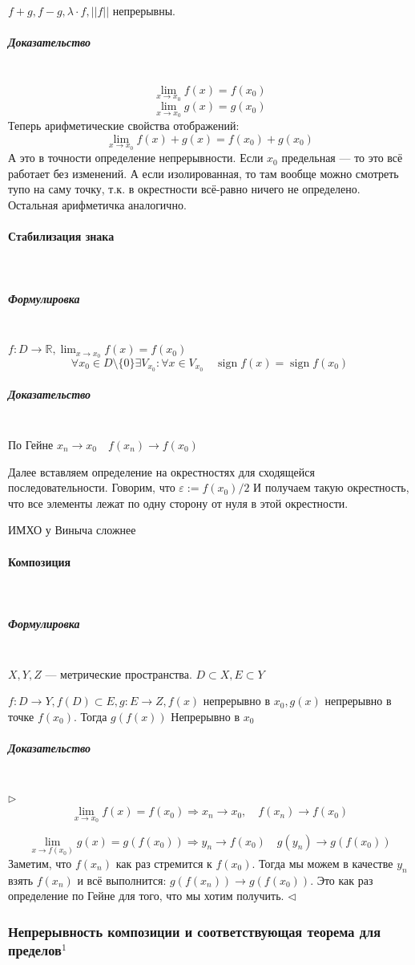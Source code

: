 \documentclass{article}
\DeclareMathOperator{\sign}{sign}
\let\vanillaparagraph\paragraph
\let\vanillasubparagraph\subparagraph
\renewcommand{\paragraph}[1]{\vanillaparagraph{#1}\mbox{}\\}
\renewcommand{\subparagraph}[1]{\vanillasubparagraph{#1}\mbox{}\\}
\begin{document}
$f + g, f - g, \lambda \cdot f, || f ||$ непрерывны.
\subparagraph{Доказательство}
$$
\lim_{x\rightarrow x_0} f(x) = f(x_0)
$$
$$
\lim_{x\rightarrow x_0} g(x) = g(x_0)
$$
Теперь арифметические свойства отображений:
$$
\lim_{x\rightarrow x_0} f(x) + g(x) = f(x_0) + g(x_0)
$$
А это в точности определение непрерывности. Если $x_0$ предельная --- то это всё работает без изменений. А если изолированная, то там вообще можно смотреть тупо на саму точку, т.к. в окрестности всё-равно ничего не определено. Остальная арифметичка аналогично.

\paragraph{Стабилизация знака}
\subparagraph{Формулировка}
$f: D \rightarrow \mathbb{R}, \lim_{x\rightarrow x_0} f(x) = f(x_0)$
$$
\forall x_0 \in D \setminus \{0\} \exists V_{x_0} : \forall x \in V_{x_0} \quad \sign f(x) = \sign f(x_0)
$$

\subparagraph{Доказательство}
По Гейне $x_n \rightarrow x_0 \quad f(x_n) \rightarrow f(x_0)$

Далее вставляем определение на окрестностях для сходящейся последовательности. Говорим, что $\varepsilon := f(x_0) / 2$ И получаем такую окрестность, что все элементы лежат по одну сторону от нуля в этой окрестности. 

ИМХО у Виныча сложнее

\paragraph{Композиция}
\label{Композиция}
\subparagraph{Формулировка}
$X, Y, Z$ --- метрические пространства. $D \subset X, E \subset Y$ 

$f: D \rightarrow Y, f(D) \subset E, g: E \rightarrow Z, f(x)$ непрерывно в $x_0, g(x)$ непрерывно в точке $f(x_0)$. Тогда $g(f(x))$ Непрерывно в $x_0$

\subparagraph{Доказательство}
$\rhd$
$$
\lim_{x\rightarrow x_0} f(x) = f(x_0) \Rightarrow x_n \rightarrow x_0, \quad f(x_n) \rightarrow f(x_0)
$$

$$
\lim_{x\rightarrow f(x_0)} g(x) = g(f(x_0)) \Rightarrow y_n \rightarrow f(x_0) \quad g(y_n) \rightarrow g(f(x_0))
$$
Заметим, что $f(x_n)$ как раз стремится к $f(x_0)$. Тогда мы можем в качестве $y_n$ взять $f(x_n)$ и всё выполнится: $g(f(x_n)) \rightarrow g(f(x_0))$. Это как раз определение по Гейне для того, что мы хотим получить. $\lhd$


\subsubsection{Непрерывность композиции и соответствующая теорема для пределов\texorpdfstring{$^1$}{}}
\end{document}
